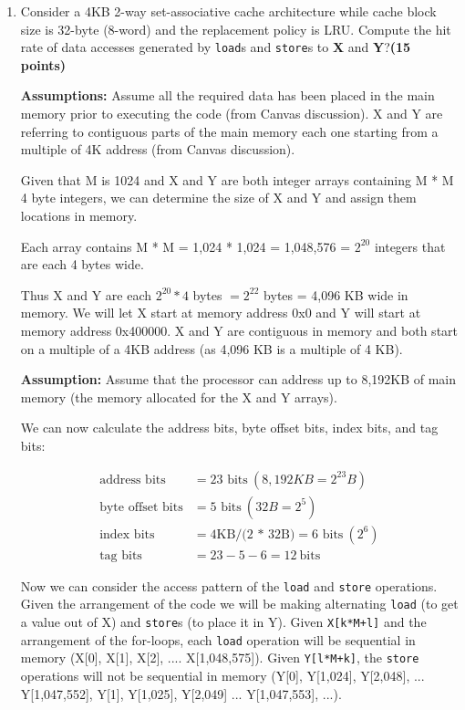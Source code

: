 \documentclass[a4paper, 11pt]{exam}
\begin{document}
\begin{enumerate}
\begin{enumerate}
\item Consider a 4KB 2-way set-associative cache architecture while cache block size is 32-byte (8-word) and the replacement policy is LRU. Compute the hit rate of data accesses generated by \texttt{load}s and \texttt{store}s to \textbf{X} and \textbf{Y}?\textbf{(15 points)}

\textbf{Assumptions:} Assume all the required data has been placed in the main memory prior to executing the code (from Canvas discussion). X and Y are referring to contiguous parts of the main memory each one starting from a multiple of 4K address (from Canvas discussion).

	Given that M is 1024 and X and Y are both integer arrays containing M * M 4 byte integers, we can determine the size of X and Y and assign them locations in memory. 
	
	Each array contains M * M = 1,024 * 1,024 = 1,048,576 = $2^{20}$ integers that are each 4 bytes wide. 
	
	Thus X and Y are each $2^{20} * 4$ bytes $= 2^{22}$ bytes = 4,096 KB wide in memory. We will let X start at memory address 0x0 and Y will start at memory address 0x400000. X and Y are contiguous in memory and both start on a multiple of a 4KB address (as 4,096 KB is a multiple of 4 KB).
	
\textbf{Assumption:} Assume that the processor can address up to 8,192KB of main memory (the memory allocated for the X and Y arrays).

We can now calculate the address bits, byte offset bits, index bits, and tag bits:

\begin{align*}
\text{address bits} &= \text{23 bits} \  (8,192KB = 2^{23} B) \\
\text{byte offset bits} &= \text{5 bits} \ (32B = 2^5) \\
\text{index bits} &= \text{4KB/(2 * 32B)} = \text{6 bits} \ (2^{6})\\
\text{tag bits} &= 23 - 5 - 6 = 12 \ \text{bits}         
\end{align*}

Now we can consider the access pattern of the \texttt{load} and \texttt{store} operations. Given the arrangement of the code we will be making alternating \texttt{load} (to get a value out of X) and \texttt{store}s (to place it in Y). Given \texttt{X[k*M+l]} and the arrangement of the for-loops, each \texttt{load} operation will be sequential in memory (X[0], X[1], X[2], .... X[1,048,575]). Given \texttt{Y[l*M+k]}, the \texttt{store} operations will not be sequential in memory (Y[0], Y[1,024], Y[2,048], ... Y[1,047,552], Y[1], Y[1,025], Y[2,049] ... Y[1,047,553], ...).


\end{enumerate}
\end{enumerate}
\end{document}
